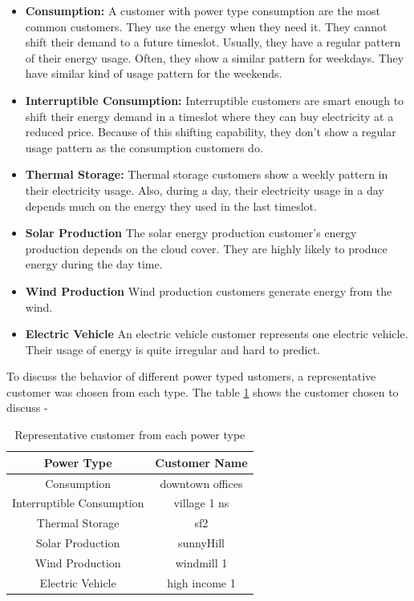 \begin{itemize}
\item \textbf{Consumption: } A customer with power type consumption are the most common customers. They use the energy when they need it. They cannot shift their demand to a future timeslot. Usually, they have a regular pattern of their energy usage. Often, they show a similar pattern for weekdays. They have similar kind of usage pattern for the weekends. 



\item \textbf{Interruptible Consumption: }
Interruptible customers are smart enough to shift their energy demand in a timeslot where they can buy electricity at a reduced price. Because of this shifting capability, they don't show a regular usage pattern as the consumption customers do. 

\item \textbf{Thermal Storage: }
Thermal storage customers show a weekly pattern in their electricity usage. Also, during a day, their electricity usage in a day depends  much on the energy they used in the last timeslot. 


\item \textbf{Solar Production}
The solar energy production customer's energy production depends on the cloud cover. They are highly likely to produce energy during the day time.

\item\textbf{Wind Production} Wind production customers generate energy from the wind.
\item \textbf{Electric Vehicle} An electric vehicle customer represents one electric vehicle. Their usage of energy is quite irregular and hard to predict. \\
\end{itemize}

 To discuss the behavior of different power typed ustomers, a representative customer was chosen from each type. The table \ref{table:repCust} shows the customer chosen to discuss -

\begin{table}[h!]
\centering
\begin{tabular}{ |c|c| } 
\hline
Power Type & Customer Name \\
\hline
Consumption & downtown offices \\ 
Interruptible Consumption & village 1 ns \\ 
Thermal Storage & sf2 \\ 
Solar Production & sunnyHill \\ 
Wind Production & windmill 1 \\ 
Electric Vehicle & high income 1 \\ 
\hline
\end{tabular}
\caption{Representative customer from each power type}
\label{table:repCust}
\end{table}

